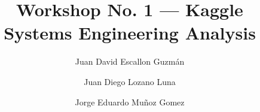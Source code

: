 \documentclass[12pt, a4paper]{report}  %
\begin{document}
\title{Workshop No. 1 — Kaggle Systems Engineering Analysis}
\author{Juan David Escallon Guzmán \and Juan Diego Lozano Luna \and Jorge Eduardo Muñoz Gomez}
\maketitle

\tableofcontents
\newpage

 

 



 


\end{document}
